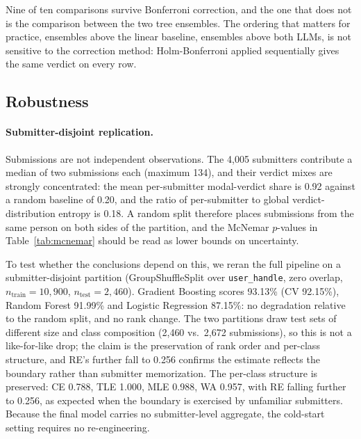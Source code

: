 \documentclass[acmsmall]{acmart}
\begin{document}
Nine of ten comparisons survive Bonferroni correction, and the one that does
not is the comparison between the two tree ensembles. The ordering that matters
for practice, ensembles above the linear baseline, ensembles above both
LLMs, is not sensitive to the correction method: Holm-Bonferroni applied
sequentially gives the same verdict on every row.

\subsection{Robustness}
\label{sec:robust}

\paragraph{Submitter-disjoint replication.} Submissions are not independent
observations. The 4{,}005 submitters contribute a median of two submissions
each (maximum 134), and their verdict mixes are strongly concentrated: the mean
per-submitter modal-verdict share is 0.92 against a random baseline of 0.20,
and the ratio of per-submitter to global verdict-distribution entropy is 0.18.
A random split therefore places submissions from the same person on both sides
of the partition, and the McNemar $p$-values in Table~\ref{tab:mcnemar} should
be read as lower bounds on uncertainty.

To test whether the conclusions depend on this, we reran the full pipeline on a
submitter-disjoint partition (GroupShuffleSplit over \texttt{user\_handle},
zero overlap, $n_{\text{train}}=10{,}900$, $n_{\text{test}}=2{,}460$).
Gradient Boosting scores 93.13\% (CV 92.15\%), Random Forest 91.99\% and
Logistic Regression 87.15\%: no degradation relative to the random split, and
no rank change. The two partitions draw test sets of different size and class
composition (2,460 vs.\ 2,672 submissions), so this is not a like-for-like drop;
the claim is the preservation of rank order and per-class structure, and RE's
further fall to 0.256 confirms the estimate reflects the boundary rather than
submitter memorization. The per-class structure is preserved: CE 0.788, TLE 1.000,
MLE 0.988, WA 0.957, with RE falling further to 0.256, as expected when the
boundary is exercised by unfamiliar submitters. Because the final model carries
no submitter-level aggregate, the cold-start setting requires no re-engineering.
\end{document}
